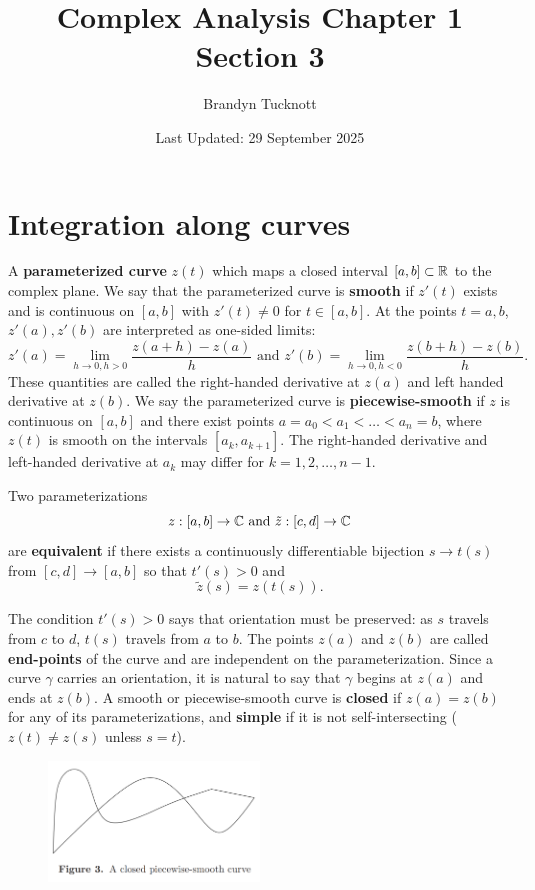 \documentclass{exam}
\title{Complex Analysis Chapter 1 Section 3}
\author{Brandyn Tucknott}
\date{Last Updated: 29 September 2025}
\begin{document}
\maketitle

\section{Integration along curves}
A \textbf{parameterized curve} $z(t)$ which maps a closed interval $[a, b] \subset \mathbb {R}$ to the complex plane. We say that the parameterized
curve is \textbf{smooth} if $z'(t)$ exists and is continuous on $[a, b]$ with $z'(t) \neq 0$ for $t\in [a ,b]$. At the points $t = a, b$,
$z'(a), z'(b)$ are interpreted as one-sided limits:
$$z'(a) = \lim_{h\to 0, h > 0} \frac{z(a + h) - z(a)}{h} \text{ and } z'(b) = \lim_{h\to 0, h < 0} \frac{z(b + h) - z(b)}{h}.$$
These quantities are called the right-handed derivative at $z(a)$ and left handed derivative at $z(b)$. We say the parameterized curve is
\textbf{piecewise-smooth} if $z$ is continuous on $[a, b]$ and there exist points $a = a_0 < a_1 < \hdots < a_n = b$,
where $z(t)$ is smooth on the intervals $[a_k, a_{k + 1}]$. The right-handed derivative and left-handed derivative at $a_k$ may differ for 
$k = 1, 2, \hdots, n - 1$.

Two parameterizations
$$z: [a, b]\to\mathbb{C} \text{ and } \tilde{z}: [c, d]\to \mathbb{C}$$
are \textbf{equivalent} if there exists a continuously differentiable bijection $s\to t(s)$ from $[c, d]\to[a, b]$ so that $t'(s) > 0$ and
$$\tilde{z}(s) = z(t(s)).$$

The condition $t'(s) > 0$ says that orientation must be preserved: as $s$ travels from $c$ to $d$, $t(s)$ travels from $a$ to $b$. The points
$z(a)$ and $z(b)$ are called \textbf{end-points} of the curve and are independent on the parameterization. Since a curve $\gamma$ carries an
orientation, it is natural to say that $\gamma$ begins at $z(a)$ and ends at $z(b)$. A smooth or piecewise-smooth curve is \textbf{closed}
if $z(a) = z(b)$ for any of its parameterizations, and \textbf{simple} if it is not self-intersecting ($z(t) \neq z(s)$ unless $s = t$).

\begin{figure}[H]
    \centering
    \includegraphics[width=0.5\textwidth]{figures/complex_analysis/figure_3.png}
\end{figure}
\end{document}
